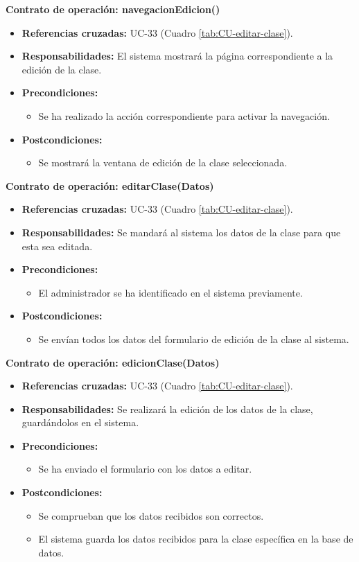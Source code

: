 \textbf{Contrato de operación: navegacionEdicion()}
\begin{itemize}
\item \textbf{Referencias cruzadas:} UC-33 (Cuadro \ref{tab:CU-editar-clase}).
\item \textbf{Responsabilidades:} El sistema mostrará la página correspondiente a la edición de la clase.
\item \textbf{Precondiciones:} 
 \begin{itemize}
\item Se ha realizado la acción correspondiente para activar la navegación.
\end {itemize}
\item \textbf{Postcondiciones:} 
 \begin{itemize}
\item Se mostrará la ventana de edición de la clase seleccionada.
\end {itemize}
\end {itemize}

\textbf{Contrato de operación: editarClase(Datos)}
\begin{itemize}
\item \textbf{Referencias cruzadas:} UC-33 (Cuadro \ref{tab:CU-editar-clase}).
\item \textbf{Responsabilidades:} Se mandará al sistema los datos de la clase para que esta sea editada.
\item \textbf{Precondiciones:} 
 \begin{itemize}
\item El administrador se ha identificado en el sistema previamente.
\end {itemize}
\item \textbf{Postcondiciones:} 
 \begin{itemize}
\item Se envían todos los datos del formulario de edición de la clase al sistema.
\end {itemize}
\end {itemize}

\textbf{Contrato de operación: edicionClase(Datos)}
\begin{itemize}
\item \textbf{Referencias cruzadas:} UC-33 (Cuadro \ref{tab:CU-editar-clase}).
\item \textbf{Responsabilidades:} Se realizará la edición de los datos de la clase, guardándolos en el sistema.
\item \textbf{Precondiciones:} 
 \begin{itemize}
\item Se ha enviado el formulario con los datos a editar.
\end {itemize}
\item \textbf{Postcondiciones:} 
 \begin{itemize}
 \item Se comprueban que los datos recibidos son correctos.
\item El sistema guarda los datos recibidos para la clase específica en la base de datos.
\end {itemize}
\end {itemize}


